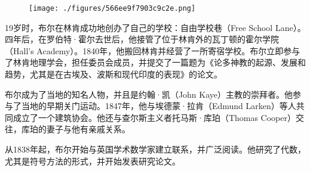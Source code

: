 \begin{figure}[ht]
\centering
\texttt{[image: ./figures/566ee9f7903c9c2e.png]}
\caption{} \label{fig_George_5}
\end{figure}
19岁时，布尔在林肯成功地创办了自己的学校：自由学校巷（Free School Lane）。四年后，在罗伯特·霍尔去世后，他接管了位于林肯外的瓦丁顿的霍尔学院（Hall's Academy）。1840年，他搬回林肯并经营了一所寄宿学校。布尔立即参与了林肯地理学会，担任委员会成员，并提交了一篇题为《论多神教的起源、发展和趋势，尤其是在古埃及、波斯和现代印度的表现》的论文。

布尔成为了当地的知名人物，并且是约翰·凯（John Kaye）主教的崇拜者。他参与了当地的早期关门运动。1847年，他与埃德蒙·拉肯（Edmund Larken）等人共同成立了一个建筑协会。他还与查尔斯主义者托马斯·库珀（Thomas Cooper）交往，库珀的妻子与他有亲戚关系。

从1838年起，布尔开始与英国学术数学家建立联系，并广泛阅读。他研究了代数，尤其是符号方法的形式，并开始发表研究论文。